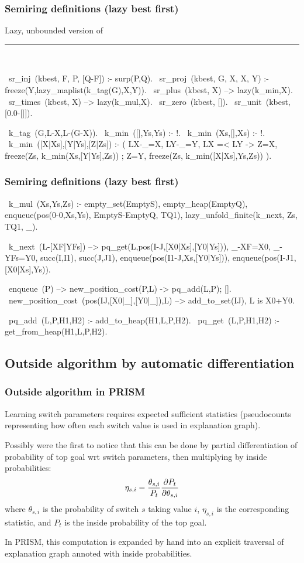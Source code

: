 \documentclass[usenames,dvipsnames]{beamer}
\newenvironment{isframe}[1][untitled]{\begin{frame}[fragile=singleslide,environment=isframe]\frametitle{#1}}{\end{frame}}
\begin{document}
\begin{isframe}[Semiring definitions (lazy best first)]
Lazy, unbounded version of \citet{HuangChiang2005}
\rule{\linewidth}{0.4pt}\\
\begin{prolog}[xleftmargin=0em,basicstyle=\small]
	~sr_inj~(kbest,   F, P, [Q-F]) :- surp(P,Q).
	~sr_proj~(kbest,  G, X, X, Y)  :- freeze(Y,lazy_maplist(k_tag(G),X,Y)).
	~sr_plus~(kbest,  X) --> lazy(k_min,X).
	~sr_times~(kbest, X) --> lazy(k_mul,X).
	~sr_zero~(kbest,  []).
	~sr_unit~(kbest,  [0.0-[]]).

	~k_tag~(G,L-X,L-(G-X)).
	~k_min~([],Ys,Ys) :- !.
	~k_min~(Xs,[],Xs) :- !.
	~k_min~([X|Xs],[Y|Ys],[Z|Zs]) :-
		 (  LX-_=X, LY-_=Y, LX =< LY
		 -> Z=X, freeze(Zs, k_min(Xs,[Y|Ys],Zs))
		 ;  Z=Y, freeze(Zs, k_min([X|Xs],Ys,Zs))
		 ).
\end{prolog}
\end{isframe}

\begin{isframe}[Semiring definitions (lazy best first)]
\begin{prolog}[xleftmargin=0em,basicstyle=\small]
	~k_mul~(Xs,Ys,Zs) :-
		 empty_set(EmptyS), empty_heap(EmptyQ),
		 enqueue(pos(0-0,Xs,Ys), EmptyS-EmptyQ, TQ1),
		 lazy_unfold_finite(k_next, Zs, TQ1, _).

	~k_next~(L-[XF|YFs]) -->
		 \> pq_get(L,pos(I-J,[X0|Xs],[Y0|Ys])),
		 {_-XF=X0, _-YFs=Y0, succ(I,I1), succ(J,J1)},
		 enqueue(pos(I1-J,Xs,[Y0|Ys])),
		 enqueue(pos(I-J1,[X0|Xs],Ys)).

	~enqueue~(P) --> new_position_cost(P,L) -> \> pq_add(L,P); [].
	~new_position_cost~(pos(IJ,[X0|_],[Y0|_]),L) --> 
    \< add_to_set(IJ), {L is X0+Y0}.

	~pq_add~(L,P,H1,H2) :- add_to_heap(H1,L,P,H2).
	~pq_get~(L,P,H1,H2) :- get_from_heap(H1,L,P,H2).
\end{prolog}
\end{isframe}

\subsection{Outside algorithm by automatic differentiation}

\begin{isframe}[Outside algorithm in PRISM]
	\def\sw#1{#1_{s,i}}
	Learning switch parameters requires expected sufficient statistics
	(pseudocounts representing how often each switch value is used in explanation graph).

	Possibly \citet{SatoKameya2001} were the first to notice that this can be done by partial differentiation of
	probability of top goal wrt switch parameters, then multiplying by inside probabilities: 
	\[ 
		\sw\eta = \frac{\sw\theta}{P_t} \pd{P_t}{\sw\theta}
	\]
	where $\sw\theta$ is the probability of switch $s$ taking value $i$,
	$\sw\eta$ is the corresponding statistic, and $P_t$ is the inside probability 
	of the top goal. 

	In PRISM, this computation is expanded by hand into an explicit traversal of explanation graph annoted
  with inside probabilities.
\end{isframe}
\end{document}
